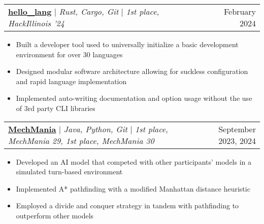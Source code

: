 \documentclass[letterpaper,11pt]{article}
\makeatletter
\newcommand{\resumeItem}[1]{
  \item\small{
    {#1 \vspace{-2pt}}
  }
}
\newcommand{\resumeProjectHeading}[2]{
    \item
    \begin{tabular*}{0.97\textwidth}{l@{\extracolsep{\fill}}r}
      \small#1 & #2 \\
    \end{tabular*}\vspace{-7pt}
}
\newcommand{\resumeItemListStart}{\begin{itemize}}
\newcommand{\resumeItemListEnd}{\end{itemize}\vspace{-5pt}}
\makeatother
\begin{document}
        \resumeProjectHeading {
            \textbf{\href{https://devpost.com/software/hello_lang}{hello\_lang}} $|$
            \footnotesize\emph{Rust, Cargo, Git} $|$ 
            \footnotesize\emph{1st place, HackIllinois '24}
        }{ February 2024 }
        \resumeItemListStart
            \resumeItem{Built a developer tool used to universally initialize a basic development environment for over 30 languages}
            \resumeItem{Designed modular software architecture allowing for suckless configuration and rapid language implementation}
            \resumeItem{Implemented auto-writing documentation and option usage without the use of 3rd party CLI libraries}
        \resumeItemListEnd

        \resumeProjectHeading {
            \textbf{\href{https://www.mechmania.org/}{MechMania}} $|$
            \footnotesize\emph{Java, Python, Git} $|$
            \footnotesize\emph{1st place, MechMania 29, 1st place, MechMania 30}
        }{ September 2023, 2024 }
        \resumeItemListStart
            \resumeItem{Developed an AI model that competed with other participants' models in a simulated turn-based environment}
            \resumeItem{Implemented A* pathfinding with a modified Manhattan distance heuristic}
            \resumeItem{Employed a divide and conquer strategy in tandem with pathfinding to outperform other models}
        \resumeItemListEnd



        
\end{document}
